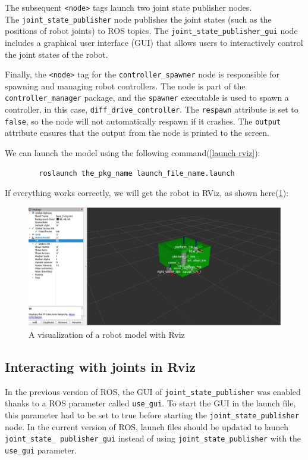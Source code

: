 \documentclass[../../main]{subfiles}
\begin{document}
    The subsequent \texttt{<node>} tags launch two joint state publisher nodes.\\ The \texttt{joint\_state\_publisher} node publishes the joint states (such as the positions of robot joints) to ROS topics. The \texttt{joint\_state\_publisher\_gui} node includes a graphical user interface (GUI) that allows users to interactively control the joint states of the robot.
    
    Finally, the \texttt{<node>} tag for the \texttt{controller\_spawner} node is responsible for spawning and managing robot controllers. The node is part of the \texttt{controller\_manager} package, and the \texttt{spawner} executable is used to spawn a controller, in this case, \texttt{diff\_drive\_controller}. The \texttt{respawn} attribute is set to \texttt{false}, so the node will not automatically respawn if it crashes. The \texttt{output} attribute ensures that the output from the node is printed to the screen.
    
    We can launch the model using the following command(\cref{launch rviz}):
    \begin{codebox}[label=launch rviz]{}
      \begin{verbatim}
        roslaunch the_pkg_name launch_file_name.launch
      \end{verbatim}
      \end{codebox}
    If everything works correctly, we will get the robot in RViz, as shown
    here(\cref{A visualization of a robot model with Rviz}):
    \begin{figure}[h!]
        \centering
        \includegraphics[width=\textwidth]{img/roborRvz1.jpg}
        \caption{A visualization of a robot model with Rviz}
\label{A visualization of a robot model with Rviz}
    \end{figure}
    \newpage
\subsection{Interacting with joints in Rviz}
In the previous version of ROS, the GUI of \texttt{joint\_state\_publisher} was enabled
thanks to a ROS parameter called \texttt{use\_gui}. To start the GUI in the launch file, this
parameter had to be set to true before starting the \texttt{joint\_state\_publisher} node.
In the current version of ROS, launch files should be updated to launch \texttt{joint\_state\_
publisher\_gui} instead of using \texttt{joint\_state\_publisher} with the \texttt{use\_gui}
parameter.
\end{document}
